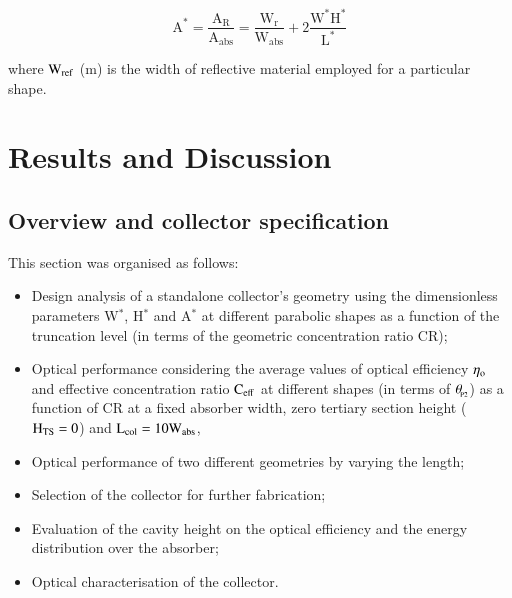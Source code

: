 \vspace{-0.75cm}
\begin{equation}
\mathrm{{A^*} = \frac{{{A_R}}}{{{A_{abs}}}} = \frac{{{W_r}}}{{{W_{abs}}}} + 2\frac{{{W^*}{H^*}}}{{{L^*}}}}
\label{reflectorarea}
\end{equation}

\noindent where $\rm{W_{ref}}$ (m) is the width of reflective material employed for a particular shape.

\section{Results and Discussion}

\subsection{Overview and collector specification}

This section was organised as follows:

\begin{itemize}[topsep=5pt,partopsep=0pt] \itemsep0pt
\item Design analysis of a standalone collector's geometry using the dimensionless parameters W$^{*}$, H$^{*}$ and A$^{*}$ at different parabolic shapes as a function of the truncation level (in terms of the geometric concentration ratio CR);
\item Optical performance considering the average values of optical efficiency $\rm{\eta_o}$ and effective concentration ratio $\rm{C_{eff}}$ at different shapes (in terms of $\theta_{\!_{\rm{P2}}}$) as a function of CR at a fixed absorber width, zero tertiary section height ($\rm{H_{TS} = 0}$) and $\rm{L_{col} = 10W_{abs}}$, 
\item Optical performance of two different geometries by varying the length;
\item Selection of the collector for further fabrication;
\item Evaluation of the cavity height on the optical efficiency and the energy distribution over the absorber;
\item Optical characterisation of the collector.
\end{itemize}


